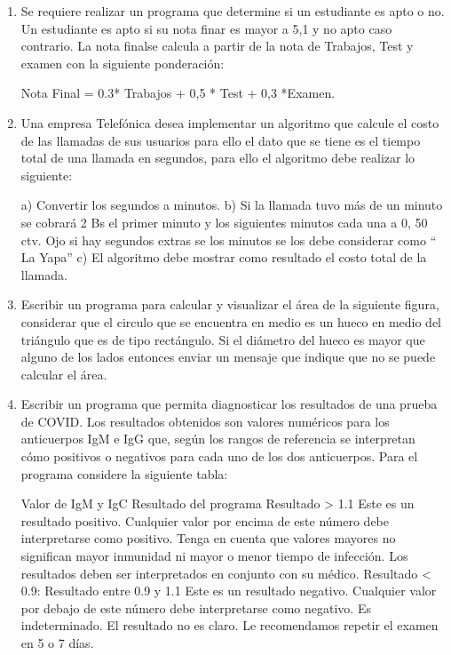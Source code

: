 \documentclass{scrartcl}
\begin{document}
\begin{enumerate}
		\item Se requiere realizar un programa que determine si un estudiante es apto o no. Un estudiante es apto si su nota finar es mayor a 5,1 y no apto caso contrario. La nota finalse calcula a partir de la nota de Trabajos, Test y examen con la siguiente ponderación:
		
		Nota Final = 0.3* Trabajos + 0,5 * Test + 0,3 *Examen.
		
		\item Una empresa Telefónica desea implementar un algoritmo que calcule el costo de las llamadas de sus usuarios para ello el dato que se tiene es el tiempo total de una llamada en segundos, para ello el algoritmo debe realizar lo siguiente:
		
		a) Convertir los segundos a minutos.
		b) Si la llamada tuvo más de un minuto se cobrará 2 Bs el primer minuto y los
		siguientes minutos cada una a 0, 50 ctv. Ojo si hay segundos extras se los
		minutos se los debe considerar como “ La Yapa”
		c) El algoritmo debe mostrar como resultado el costo total de la llamada.
		
		\item Escribir un programa para calcular y visualizar el área de la siguiente figura, considerar que el circulo que se encuentra en medio es un hueco en medio del triángulo que es de tipo rectángulo. Si el diámetro del hueco es mayor que alguno de los lados entonces enviar un mensaje que indique que no se puede calcular el área.
		
		\item Escribir un programa que permita diagnosticar los resultados de una prueba de COVID. Los resultados obtenidos son valores numéricos para los anticuerpos IgM e IgG que, según los rangos de referencia se interpretan cómo positivos o negativos para cada uno de los dos anticuerpos. Para el programa considere la siguiente tabla:
		
		Valor de IgM y IgC
		Resultado del programa
		Resultado > 1.1
		Este es un resultado positivo. Cualquier valor por
		encima de este número debe interpretarse como
		positivo. Tenga en cuenta que valores mayores
		no significan mayor inmunidad ni mayor o menor
		tiempo de infección. Los resultados deben ser
		interpretados en conjunto con su médico.
		Resultado < 0.9:
		Resultado entre 0.9 y
		1.1
		Este es un resultado negativo. Cualquier valor
		por debajo de este número debe interpretarse
		como negativo.
		Es indeterminado. El resultado no es claro. Le
		recomendamos repetir el examen en 5 o 7 días.
		

\end{enumerate}
\end{document}
